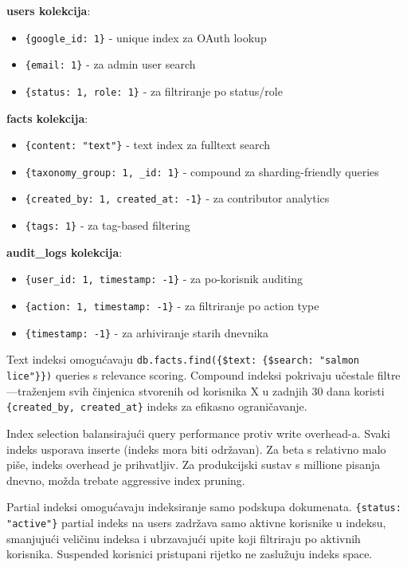 \documentclass[12pt,a4paper]{article}
\begin{document}
\textbf{users kolekcija}:
\begin{itemize}[noitemsep]
    \item \texttt{\{google\_id: 1\}} - unique index za OAuth lookup
    \item \texttt{\{email: 1\}} - za admin user search
    \item \texttt{\{status: 1, role: 1\}} - za filtriranje po status/role
\end{itemize}

\textbf{facts kolekcija}:
\begin{itemize}[noitemsep]
    \item \texttt{\{content: "text"\}} - text index za fulltext search
    \item \texttt{\{taxonomy\_group: 1, \_id: 1\}} - compound za sharding-friendly queries
    \item \texttt{\{created\_by: 1, created\_at: -1\}} - za contributor analytics
    \item \texttt{\{tags: 1\}} - za tag-based filtering
\end{itemize}

\textbf{audit\_logs kolekcija}:
\begin{itemize}[noitemsep]
    \item \texttt{\{user\_id: 1, timestamp: -1\}} - za po-korisnik auditing
    \item \texttt{\{action: 1, timestamp: -1\}} - za filtriranje po action type
    \item \texttt{\{timestamp: -1\}} - za arhiviranje starih dnevnika
\end{itemize}

Text indeksi omogućavaju \texttt{db.facts.find(\{\$text: \{\$search: "salmon lice"\}\})} queries s relevance scoring. Compound indeksi pokrivaju učestale filtre—traženjem svih činjenica stvorenih od korisnika X u zadnjih 30 dana koristi \texttt{\{created\_by, created\_at\}} indeks za efikasno ograničavanje.

Index selection balansirajući query performance protiv write overhead-a. Svaki indeks usporava inserte (indeks mora biti održavan). Za beta s relativno malo piše, indeks overhead je prihvatljiv. Za produkcijski sustav s millione pisanja dnevno, možda trebate aggressive index pruning.

Partial indeksi omogućavaju indeksiranje samo podskupa dokumenata. \texttt{\{status: "active"\}} partial indeks na users zadržava samo aktivne korisnike u indeksu, smanjujući veličinu indeksa i ubrzavajući upite koji filtriraju po aktivnih korisnika. Suspended korisnici pristupani rijetko ne zaslužuju indeks space.
\end{document}
